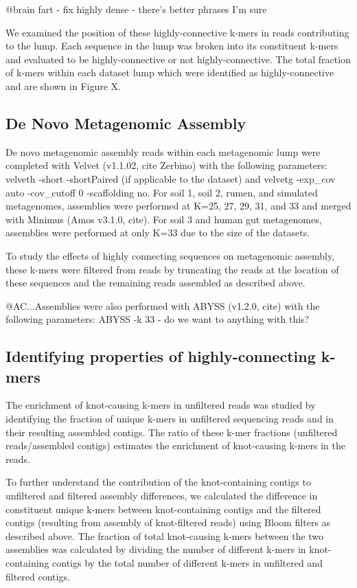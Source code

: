 \documentclass[11pt]{article} %
\begin{document}
@brain fart - fix highly dense - there's better phrases I'm sure

We examined the position of these highly-connective k-mers in reads contributing
to the lump. Each sequence in the lump was broken into its constituent
k-mers and evaluated to be highly-connective or not highly-connective.  The total fraction of k-mers within each dataset lump which were identified
as highly-connective and are shown in Figure X. 



\subsection{De Novo Metagenomic Assembly}
De novo metagenomic assembly reads within each metagenomic lump
were completed with Velvet (v1.1.02, cite Zerbino) with the following
parameters: velveth -short -shortPaired (if applicable to the dataset)
and velvetg -exp\_cov auto -cov\_cutoff 0 -scaffolding no.  For soil 1, soil 2, rumen, and simulated metagenomes, assemblies were performed at K=25, 27, 29, 31, and 33 and merged with Minimus (Amos v3.1.0, cite).  For soil 3 and human gut metagenomes, assemblies were performed at only K=33 due to the size of the datasets.  

To study the effects of highly connecting sequences on metagenomic assembly, these k-mers were filtered from reads by truncating the reads at the location of these sequences and the remaining reads assembled as described above.

@AC...Assemblies were also performed with ABYSS (v1.2.0, cite) with the following parameters: ABYSS -k 33  - do we want to anything with this?


\subsection{Identifying properties of highly-connecting k-mers}
The enrichment of knot-causing k-mers in unfiltered reads was studied
by identifying the fraction of unique k-mers in unfiltered sequencing
reads and in their resulting assembled contigs. The ratio of these k-mer fractions (unfiltered reads/assembled contigs) estimates the enrichment of knot-causing k-mers in the reads. 

To further understand the contribution of the knot-containing
contigs to unfiltered and filtered assembly differences, we calculated
the difference in constituent unique k-mers between knot-containing
contigs and the filtered contigs (resulting from assembly of knot-filtered reads)
using Bloom filters as described above. The fraction of total knot-causing
k-mers between the two assemblies was calculated by dividing the number
of different k-mers in knot-containing contigs by the total number
of different k-mers in unfiltered and filtered contigs. 
\end{document}
